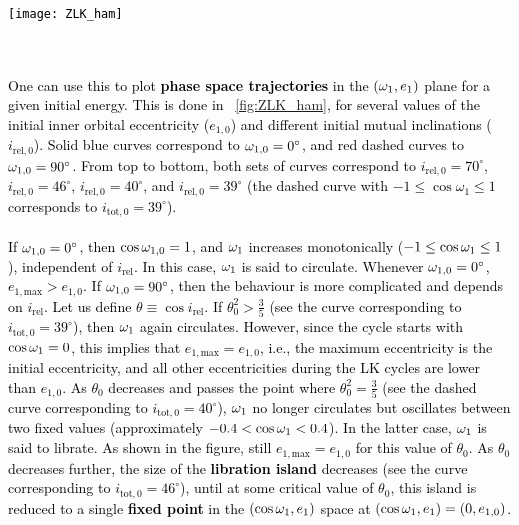 \documentclass[main.tex]{subfiles}
\begin{document}
\begin{tcolorbox}[sharp corners, colback=green!30, colframe=green!80!blue, title=Box \ref{boxchap3:dynVI} -- Orbital dynamics VI (continued)]
\par \textcolor{black}{
\begin{minipage}[t]{0.5\linewidth}
    \vspace*{0pt}
        \texttt{[image: ZLK\_ham]}
        \label{fig:ZLK_ham}
    \end{minipage} \\ \\
One can use this to plot {\bf phase space trajectories} in the $(\omega_1,e_1)$ plane for a given initial energy. This is done in \F~\ref{fig:ZLK_ham}, for several values of the initial inner orbital eccentricity ($e_{1,0}$) and different initial mutual inclinations ($i_{\mathrm{rel},0}$). Solid blue curves correspond to $\omega_{1,0} = 0^\circ$, and red dashed curves to $\omega_{1,0} = 90^\circ$. From top to bottom, both sets of curves correspond to $i_{\mathrm{rel},0} = 70^\circ$, $i_{\mathrm{rel},0} = 46^\circ$, $i_{\mathrm{rel},0} = 40^\circ$, and $i_{\mathrm{rel},0} = 39^\circ$ (the dashed curve with $-1\leq\cos\omega_1\leq1$ corresponds to $i_{\mathrm{tot},0} = 39^\circ$). \\ \\
If $\omega_{1,0} = 0^\circ$, then $\cos\omega_{1,0} = 1$, and $\omega_1$ increases monotonically ($-1 \leq \cos\omega_1 \leq 1$), independent of $i_\mathrm{rel}$. In this case, $\omega_1$ is said to circulate. Whenever $\omega_{1,0} = 0^\circ$, $e_{1,\mathrm{max}} > e_{1,0}$. If $\omega_{1,0} = 90^\circ$, then the behaviour is more complicated and depends on $i_\mathrm{rel}$. Let us define $\theta \equiv \cos i_\mathrm{rel}$. If $\theta_0^2 > \frac{3}{5}$ (see the curve corresponding to $i_{\mathrm{tot},0} = 39^\circ$), then $\omega_1$ again circulates. However, since the cycle starts with $\cos\omega_1 = 0$, this implies that $e_{1,\mathrm{max}}= e_{1,0}$, i.e., the maximum eccentricity is the initial eccentricity, and all other eccentricities during the LK cycles are lower than $e_{1,0}$. As $\theta_0$ decreases and passes the point where $\theta_0^2 = \frac{3}{5}$ (see the dashed curve corresponding to $i_{\mathrm{tot},0} = 40^\circ$), $\omega_1$ no longer circulates but oscillates between two fixed values (approximately $-0.4 < \cos\omega_1 < 0.4$). In the latter case, $\omega_1$ is said to librate. As shown in the figure, still $e_{1,\mathrm{max}} = e_{1,0}$ for this value of $\theta_0$. As $\theta_0$ decreases further, the size of the {\bf libration island} decreases (see the curve corresponding to $i_{\mathrm{tot},0} = 46^\circ$), until at some critical value of $\theta_0$, this island is reduced to a single {\bf fixed point} in the $(\cos\omega_1,e_1)$ space at $(\cos \omega_1,e_1) = (0,e_{1,0})$. 
}
\end{tcolorbox}
\end{document}

